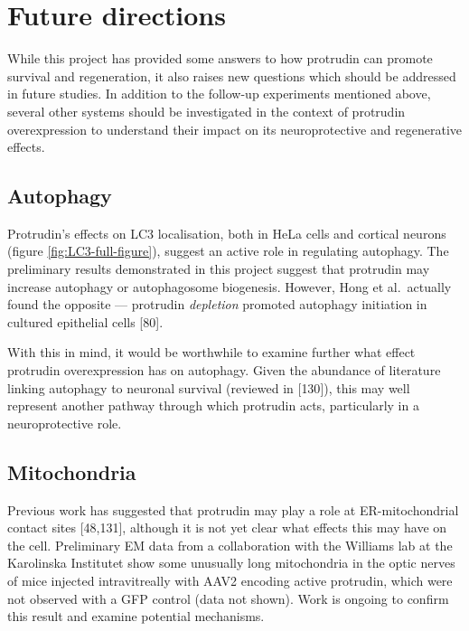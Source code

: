 \documentclass[
  12pt,
  a4paper,
]{book}
\begin{document}
\hypertarget{future-directions}{%
\section{Future directions}\label{future-directions}}

While this project has provided some answers to how protrudin can promote survival and regeneration, it also raises new questions which should be addressed in future studies. In addition to the follow-up experiments mentioned above, several other systems should be investigated in the context of protrudin overexpression to understand their impact on its neuroprotective and regenerative effects.

\hypertarget{autophagy}{%
\subsection{Autophagy}\label{autophagy}}

Protrudin's effects on LC3 localisation, both in HeLa cells and cortical neurons (figure \ref{fig:LC3-full-figure}), suggest an active role in regulating autophagy. The preliminary results demonstrated in this project suggest that protrudin may increase autophagy or autophagosome biogenesis. However, Hong et al.~actually found the opposite --- protrudin \emph{depletion} promoted autophagy initiation in cultured epithelial cells {[}80{]}.

With this in mind, it would be worthwhile to examine further what effect protrudin overexpression has on autophagy. Given the abundance of literature linking autophagy to neuronal survival (reviewed in {[}130{]}), this may well represent another pathway through which protrudin acts, particularly in a neuroprotective role.

\hypertarget{mitochondria-1}{%
\subsection{Mitochondria}\label{mitochondria-1}}

Previous work has suggested that protrudin may play a role at ER-mitochondrial contact sites {[}48,131{]}, although it is not yet clear what effects this may have on the cell. Preliminary EM data from a collaboration with the Williams lab at the Karolinska Institutet show some unusually long mitochondria in the optic nerves of mice injected intravitreally with AAV2 encoding active protrudin, which were not observed with a GFP control (data not shown). Work is ongoing to confirm this result and examine potential mechanisms.
\end{document}
